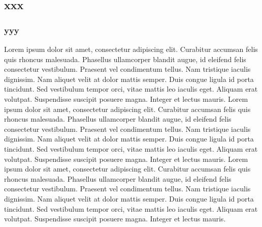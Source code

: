 \documentclass[12pt, a4paper]{book}
\newcommand\apparat[2]{\edtext{#1}{\Afootnote{#2}}}
\newcommand\apparatB[2]{\edtext{#1}{\Bfootnote{#2}}}
\begin{document}
\begin{pages}
\begin{Leftside}
\subsection{xxx}
\subsubsection{yyy}
\pend
\pstart
\begin{ledgroup}
\skipnumbering
Lorem ipsum dolor sit amet, consectetur adipiscing elit. Curabitur accumsan felis quis rhoncus malesuada. Phasellus ullamcorper blandit augue, id eleifend felis consectetur vestibulum. Praesent vel condimentum tellus. Nam tristique iaculis dignissim. Nam aliquet velit at dolor mattis semper. Duis congue ligula id porta tincidunt. Sed vestibulum tempor orci, vitae mattis leo iaculis eget. Aliquam erat volutpat. Suspendisse suscipit posuere magna. Integer et lectus mauris. \apparat{aaa}{eeee}
Lorem ipsum dolor sit amet, consectetur adipiscing elit. Curabitur accumsan felis quis rhoncus malesuada. Phasellus ullamcorper blandit augue, id eleifend felis consectetur vestibulum. Praesent vel condimentum tellus. Nam tristique iaculis dignissim. Nam aliquet velit at dolor mattis semper. Duis congue ligula id porta tincidunt. Sed vestibulum tempor orci, vitae mattis leo iaculis eget. Aliquam erat volutpat. Suspendisse suscipit posuere magna. Integer et lectus mauris. \apparatB{aaa}{eeee}
Lorem ipsum dolor sit amet, consectetur adipiscing elit. Curabitur accumsan felis quis rhoncus malesuada. Phasellus ullamcorper blandit augue, id eleifend felis consectetur vestibulum. Praesent vel condimentum tellus. Nam tristique iaculis dignissim. Nam aliquet velit at dolor mattis semper. Duis congue ligula id porta tincidunt. Sed vestibulum tempor orci, vitae mattis leo iaculis eget. Aliquam erat volutpat. Suspendisse suscipit posuere magna. Integer et lectus mauris. \apparatB{aaa}{eeee}
\end{ledgroup}
\pend
\pstart

\end{Leftside}
\end{pages}
\end{document}
